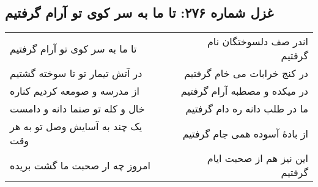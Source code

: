 \begin{center}
\section*{غزل شماره ۲۷۶: تا ما به سر کوی تو آرام گرفتیم}
\label{sec:276}
\begin{longtable}{l p{0.5cm} r}
تا ما به سر کوی تو آرام گرفتیم
&&
اندر صف دلسوختگان نام گرفتیم
\\
در آتش تیمار تو تا سوخته گشتیم
&&
در کنج خرابات می خام گرفتیم
\\
از مدرسه و صومعه کردیم کناره
&&
در میکده و مصطبه آرام گرفتیم
\\
خال و کله تو صنما دانه و دامست
&&
ما در طلب دانه ره دام گرفتیم
\\
یک چند به آسایش وصل تو به هر وقت
&&
از بادهٔ آسوده همی جام گرفتیم
\\
امروز چه ار صحبت ما گشت بریده
&&
این نیز هم از صحبت ایام گرفتیم
\\
\end{longtable}
\end{center}
